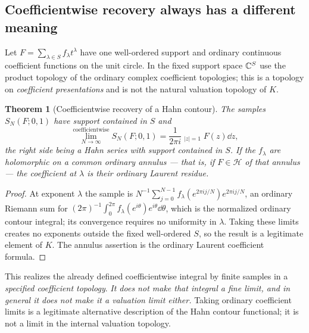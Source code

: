 \documentclass[11pt,letterpaper]{article}
\newtheorem{theorem}{Theorem}[section]
\theoremstyle{definition}
\theoremstyle{remark}
\newcommand{\HH}{\mathcal H}\newcommand{\A}{\mathscr A}\newcommand{\OO}{\mathcal O}
\newcommand{\HCoint}{\mathop{\oint^{\!H}}\nolimits}
\numberwithin{equation}{section}
\begin{document}
\subsection{Coefficientwise recovery always has a different meaning}
Let $F=\sum_{\lambda\in S}f_\lambda t^\lambda$ have one well-ordered support and
ordinary continuous coefficient functions on the unit circle. In the fixed support
space $\mathbb C^S$ use the product topology of the ordinary complex coefficient
topologies; this is a topology on \emph{coefficient presentations} and is not the
natural valuation topology of $K$.

\begin{theorem}[Coefficientwise recovery of a Hahn contour]
\label{contours:thm:sampling}
The samples $S_N(F;0,1)$ have support contained in $S$ and
\begin{equation}\label{contours:eq:coefflimit}
  \operatorname*{lim}_{N\to\infty}^{\mathrm{coefficientwise}} S_N(F;0,1)
  =\frac1{2\pi i}\HCoint_{|z|=1}F(z)\dd z ,
\end{equation}
the right side being a Hahn series with support contained in $S$. If the
$f_\lambda$ are holomorphic on a common ordinary annulus --- that is, if
$F\in\HH$ of that annulus --- the coefficient at $\lambda$ is their ordinary Laurent
residue.
\end{theorem}
\begin{proof}
At exponent $\lambda$ the sample is
$N^{-1}\sum_{j=0}^{N-1}f_\lambda(e^{2\pi ij/N})e^{2\pi ij/N}$, an ordinary Riemann
sum for $(2\pi)^{-1}\int_0^{2\pi}f_\lambda(e^{i\theta})e^{i\theta}\dd\theta$, which
is the normalized ordinary contour integral; its convergence requires no uniformity
in $\lambda$. Taking these limits creates no exponents outside the fixed
well-ordered $S$, so the result is a legitimate element of $K$. The annulus
assertion is the ordinary Laurent coefficient formula.
\end{proof}

This realizes the already defined coefficientwise integral by finite samples in a
\emph{specified coefficient topology}. \emph{It does not make that integral a fine
limit, and in general it does not make it a valuation limit either.} Taking ordinary
coefficient limits is a legitimate alternative description of the Hahn contour
functional; it is not a limit in the internal valuation topology.
\end{document}
